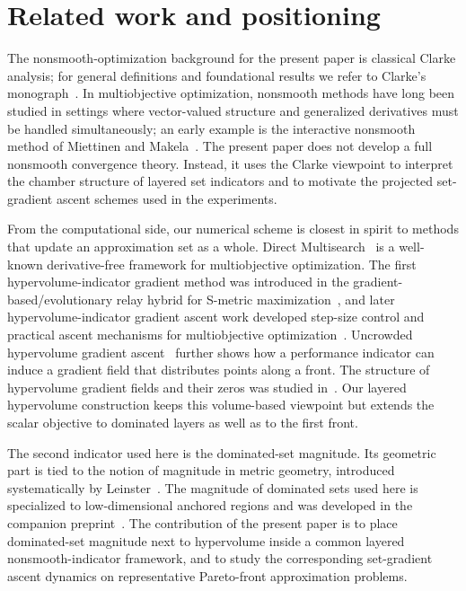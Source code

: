 \documentclass{article}
\begin{document}
\section{Related work and positioning}
The nonsmooth-optimization background for the present paper is classical Clarke analysis; for general definitions and foundational results we refer to Clarke's monograph~\cite{clarke1990}.  In multiobjective optimization, nonsmooth methods have long been studied in settings where vector-valued structure and generalized derivatives must be handled simultaneously; an early example is the interactive nonsmooth method of Miettinen and Makela~\cite{miettinenmakela1993}.  The present paper does not develop a full nonsmooth convergence theory.  Instead, it uses the Clarke viewpoint to interpret the chamber structure of layered set indicators and to motivate the projected set-gradient ascent schemes used in the experiments.

From the computational side, our numerical scheme is closest in spirit to methods that update an approximation set as a whole.  Direct Multisearch~\cite{custodioetal2011} is a well-known derivative-free framework for multiobjective optimization.  The first hypervolume-indicator gradient method was introduced in the gradient-based/evolutionary relay hybrid for S-metric maximization~\cite{emmerichdeutzbeume2007}, and later hypervolume-indicator gradient ascent work developed step-size control and practical ascent mechanisms for multiobjective optimization~\cite{wangdeutzbackemmerich2017}.  Uncrowded hypervolume gradient ascent~\cite{deistetal2020} further shows how a performance indicator can induce a gradient field that distributes points along a front.  The structure of hypervolume gradient fields and their zeros was studied in~\cite{emmerichdeutz2014}.  Our layered hypervolume construction keeps this volume-based viewpoint but extends the scalar objective to dominated layers as well as to the first front.

The second indicator used here is the dominated-set magnitude.  Its geometric part is tied to the notion of magnitude in metric geometry, introduced systematically by Leinster~\cite{leinster2013}.  The magnitude of dominated sets used here is specialized to low-dimensional anchored regions and was developed in the companion preprint~\cite{emmerich2026magnitudedominatedsetspareto}.  The contribution of the present paper is to place dominated-set magnitude next to hypervolume inside a common layered nonsmooth-indicator framework, and to study the corresponding set-gradient ascent dynamics on representative Pareto-front approximation problems.
\end{document}
